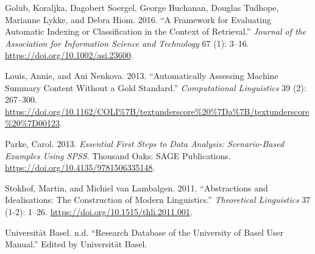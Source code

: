 \hypertarget{refs}{}
\begin{CSLReferences}{1}{0}
\leavevmode\hypertarget{ref-Golub.2016}{}%
Golub, Koraljka, Dagobert Soergel, George Buchanan, Douglas Tudhope,
Marianne Lykke, and Debra Hiom. 2016. {``A Framework for Evaluating
Automatic Indexing or Classification in the Context of Retrieval.''}
\emph{Journal of the Association for Information Science and Technology}
67 (1): 3--16. \url{https://doi.org/10.1002/asi.23600}.

\leavevmode\hypertarget{ref-Louis.2013}{}%
Louis, Annie, and Ani Nenkova. 2013. {``Automatically Assessing Machine
Summary Content Without a Gold Standard.''} \emph{Computational
Linguistics} 39 (2): 267--300.
\url{https://doi.org/10.1162/COLI\%7B/textunderscore\%20\%7Da\%7B/textunderscore\%20\%7D00123}.

\leavevmode\hypertarget{ref-Parke.2013}{}%
Parke, Carol. 2013. \emph{Essential First Steps to Data Analysis:
Scenario-Based Examples Using SPSS}. Thousand Oaks: {SAGE Publications}.
\url{https://doi.org/10.4135/9781506335148}.

\leavevmode\hypertarget{ref-Stokhof.2011}{}%
Stokhof, Martin, and Michiel van Lambalgen. 2011. {``Abstractions and
Idealisations: The Construction of Modern Linguistics.''}
\emph{Theoretical Linguistics} 37 (1-2): 1--26.
\url{https://doi.org/10.1515/thli.2011.001}.

\leavevmode\hypertarget{ref-UniversitatBasel.2021}{}%
Universität Basel. n.d. {``Research Database of the University of Basel
User Manual.''} Edited by Universität Basel.

\end{CSLReferences}
